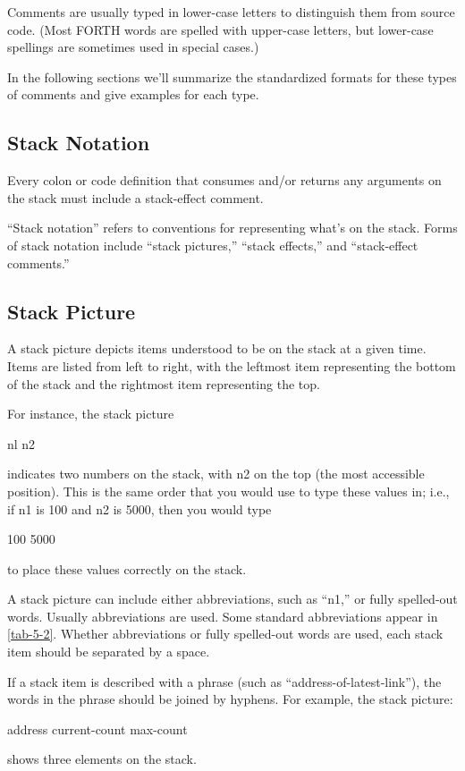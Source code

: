 Comments are usually typed in lower-case letters to distinguish
them from source code.  (Most FORTH words are spelled with upper-case
letters, but lower-case spellings are sometimes used in special cases.)

In the following sections we'll summarize the standardized formats
for these types of comments and give examples for each type.

\subsection{Stack Notation}
\begin{tip}
Every colon or code definition that consumes and/or returns any arguments
on the stack must include a stack-effect comment.
\end{tip}


``Stack notation'' refers to conventions for representing what's on the
stack.  Forms of stack notation include ``stack pictures,'' ``stack effects,''
and ``stack-effect comments.''

\subsection{Stack Picture}

A stack picture depicts items understood to be on the stack at a given
time.  Items are listed from left to right, with the leftmost item representing
the bottom of the stack and the rightmost item representing the top.

For instance, the stack picture
\begin{Code}
nl n2
\end{Code}
indicates two numbers on the stack, with n2 on the top (the most accessible
position).
This is the same order that you would use to type these values in;
i.e., if n1 is 100 and n2 is 5000, then you would type
\begin{Code}
100 5000
\end{Code}
to place these values correctly on the stack.

A stack picture can include either abbreviations, such as ``n1,'' or
fully spelled-out words.  Usually abbreviations are used.  Some standard
abbreviations appear in \ref{tab-5-2}.  Whether abbreviations or fully
spelled-out words are used, each stack item should be separated by a
space.

If a stack item is described with a phrase (such as ``address-of-latest-link''),
the words in the phrase should be joined by hyphens.  For
example, the stack picture:
\begin{Code}
address current-count max-count
\end{Code}
shows three elements on the stack.

